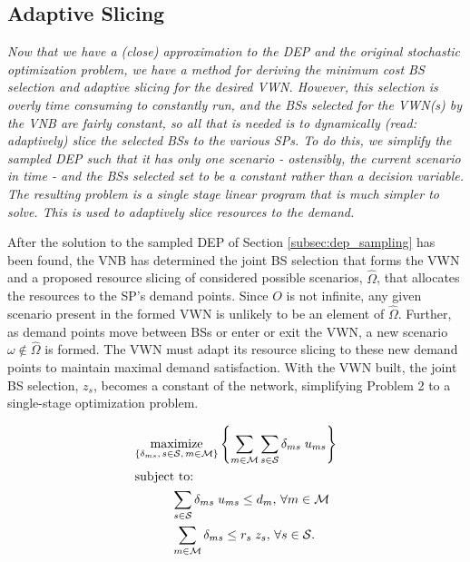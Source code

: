 \documentclass[12pt,dvipsnames]{report}
\begin{document}
\subsection{Adaptive Slicing} \label{subsec:dep_slicing}

\textit{Now that we have a (close) approximation to the DEP and the original stochastic optimization problem, we have a method for deriving the minimum cost BS selection and adaptive slicing for the desired VWN.  However, this selection is overly time consuming to constantly run, and the BSs selected for the VWN(s) by the VNB are fairly constant, so all that is needed is to dynamically (read: adaptively) slice the selected BSs to the various SPs.  To do this, we simplify the sampled DEP such that it has only one scenario - ostensibly, the current scenario in time - and the BSs selected set to be a constant rather than a decision variable.  The resulting problem is a single stage linear program that is much simpler to solve.  This is used to adaptively slice resources to the demand.}

After the solution to the sampled DEP of Section \ref{subsec:dep_sampling} has been found, the VNB has determined the joint BS selection that forms the VWN and a proposed resource slicing of considered possible scenarios, $\hat{\Omega}$, that allocates the resources to the SP's demand points.  Since $O$ is not infinite, any given scenario present in the formed VWN is unlikely to be an element of $\hat{\Omega}$.  Further, as demand points move between BSs or enter or exit the VWN, a new scenario $\omega \notin \hat{\Omega}$ is formed.  The VWN must adapt its resource slicing to these new demand points to maintain maximal demand satisfaction.  With the VWN built, the joint BS selection, $z_s$, becomes a constant of the network, simplifying Problem 2 to a single-stage optimization problem.

\begin{tcolorbox}[floatplacement = !ht, float, title = Adaptive Slicing Model]
\begin{align}
& \underset{\left\{ \substack{
	\delta_{ms},\,	s \in \mathcal{S},\, m \in \mathcal{M}} \right\}} {\text{maximize}}
\left\{ \sum_{m \in \mathcal{M}} \sum_{s \in \mathcal{S}} \delta_{ms} \; u_{ms} \right\} \label{eq:ASMO}\\
& \text{subject to:}  \nonumber \\
& \hspace{0.4in} \sum_{s \in \mathcal{S}} \delta_{ms} \; u_{ms} \leq d_m,\, \forall m \in \mathcal{M} \label{eq:ASMC1}\\
& \hspace{0.4in} \sum_{m \in \mathcal{M}} \delta_{ms} \leq r_s \; z_s,\, \forall s \in \mathcal{S}. \label{eq:ASMC2}
\end{align}
\end{tcolorbox}
\end{document}
